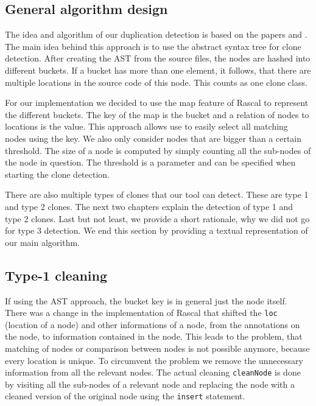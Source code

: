 \documentclass{uva-inf-article}
\begin{document}
\subsection{General algorithm design}

The idea and algorithm of our duplication detection is based on the
papers \cite{lazar2014clone} and \cite{baxter1998clone}. 
The main idea behind this approach is to use the abstract syntax tree for clone detection.
After creating the AST from the source files, the nodes are hashed into different buckets.
If a bucket has more than one element, it follows, that there are multiple locations in the source code of this node.
This counts as one clone class. 

For our implementation we decided to use the map feature of Rascal to represent the different buckets. The key of the map is the bucket and a relation of nodes to locations is the value. This approach allows use to easily select all matching nodes using the key.  We also only consider nodes that are bigger than a certain threshold. The size of a node is computed by simply counting all the sub-nodes of the node in question. The threshold is a parameter and can be specified when starting the clone detection.

There are also multiple types of clones that our tool can detect. These are type 1 and type 2 clones. The next two chapters explain the detection of type 1 and type 2 clones. Last but not least, we provide a short rationale, why we did not go for type 3 detection. We end this section by providing a textual representation of our main algorithm.

\subsection{Type-1 cleaning}\label{type1alg}

If using the AST approach, the bucket key is in general just the node itself. There was a change in the implementation of Rascal that shifted the \texttt{loc} (location of a node) and other informations of a node, from the annotations on the node, to information contained in the node. This leads to the problem, that matching of nodes or comparison between nodes is not possible anymore, because every location is unique. To circumvent the problem we remove the unnecessary information from all the relevant nodes. The actual cleaning \texttt{cleanNode} is done by visiting all the sub-nodes of a relevant node and replacing the node with a cleaned version of the original node using the \texttt{insert} statement.
\end{document}
